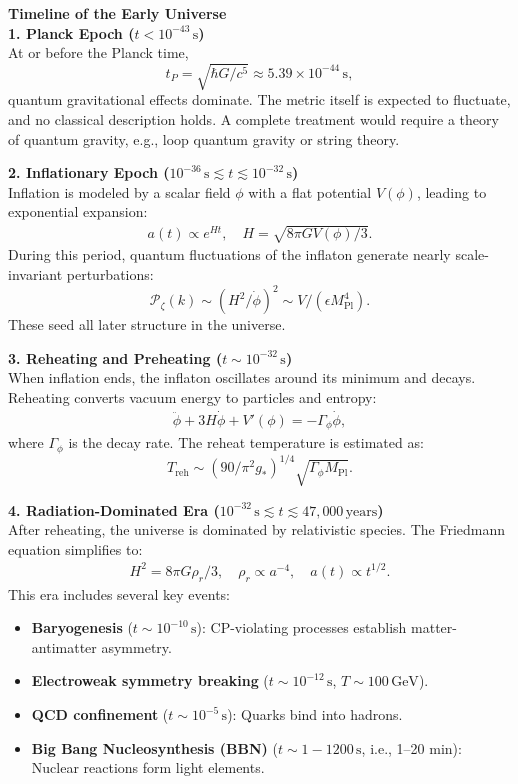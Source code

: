 \begin{technical}
{\Large\textbf{Timeline of the Early Universe}}\\[0.2em]

\noindent\textbf{1. Planck Epoch \boldmath(\( t < 10^{-43} \, \text{s} \))}\\[0.3em]
At or before the Planck time,
\[
t_P = \sqrt{\hbar G/c^5} \approx 5.39 \times 10^{-44} \, \text{s},
\]
quantum gravitational effects dominate. The metric itself is expected to fluctuate, and no classical description holds. A complete treatment would require a theory of quantum gravity, e.g., loop quantum gravity or string theory.

\noindent\textbf{2. Inflationary Epoch \boldmath(\(10^{-36} \, \text{s} \lesssim t \lesssim 10^{-32} \, \text{s} \))}\\[0.3em]
Inflation is modeled by a scalar field \(\phi\) with a flat potential \(V(\phi)\), leading to exponential expansion:
\begin{align*}
a(t) \propto e^{H t}, \quad H = \sqrt{8\pi G V(\phi)/3}.
\end{align*}
During this period, quantum fluctuations of the inflaton generate nearly scale-invariant perturbations:
\[
\mathcal{P}_\zeta(k) \sim (H^2/\dot{\phi})^2 \sim V/(\epsilon M_{\text{Pl}}^4).
\]
These seed all later structure in the universe.

\noindent\textbf{3. Reheating and Preheating \boldmath(\( t \sim 10^{-32} \, \text{s} \))}\\[0.3em]
When inflation ends, the inflaton oscillates around its minimum and decays. Reheating converts vacuum energy to particles and entropy:
\begin{align*}
\ddot{\phi} + 3H\dot{\phi} + V'(\phi) = -\Gamma_\phi \dot{\phi},
\end{align*}
where \(\Gamma_\phi\) is the decay rate. The reheat temperature is estimated as:
\[
T_{\text{reh}} \sim (90/\pi^2 g_*)^{1/4} \sqrt{\Gamma_\phi M_{\text{Pl}}}.
\]

\noindent\textbf{4. Radiation-Dominated Era \boldmath(\( 10^{-32} \, \text{s} \lesssim t \lesssim 47{,}000 \, \text{years} \))}\\[0.3em]
After reheating, the universe is dominated by relativistic species. The Friedmann equation simplifies to:
\begin{align*}
H^2 = 8\pi G \rho_r/3, \quad \rho_r \propto a^{-4}, \quad a(t) \propto t^{1/2}.
\end{align*}
This era includes several key events:
\begin{itemize}
\item \textbf{Baryogenesis} (\( t \sim 10^{-10} \, \text{s} \)): CP-violating processes establish matter-antimatter asymmetry.
\item \textbf{Electroweak symmetry breaking} (\( t \sim 10^{-12} \, \text{s} \), \( T \sim 100\,\text{GeV} \)).
\item \textbf{QCD confinement} (\( t \sim 10^{-5} \, \text{s} \)): Quarks bind into hadrons.
\item \textbf{Big Bang Nucleosynthesis (BBN)} (\( t \sim 1 - 1200 \, \text{s} \), i.e., 1–20 min): Nuclear reactions form light elements.
\end{itemize}


\end{technical}
